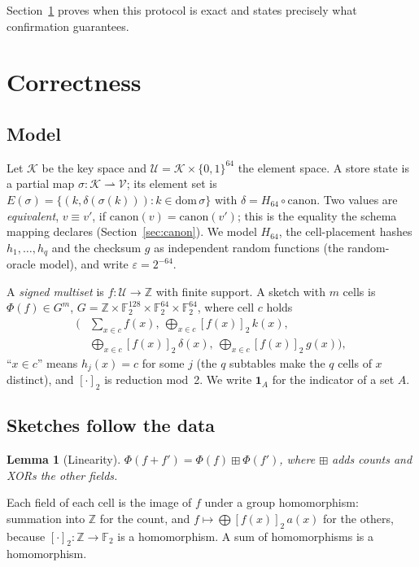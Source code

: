 \documentclass[conference]{IEEEtran}
\newtheorem{lemma}{Lemma}
\begin{document}
Section~\ref{sec:proofs} proves when this protocol is exact and states precisely what confirmation guarantees.

\section{Correctness}\label{sec:proofs}
\subsection{Model}
Let $\mathcal K$ be the key space and $\mathcal U=\mathcal K\times\{0,1\}^{64}$ the element space. A store state is a partial map $\sigma:\mathcal K\rightharpoonup\mathcal V$; its element set is $E(\sigma)=\{(k,\delta(\sigma(k))) : k\in\mathrm{dom}\,\sigma\}$ with $\delta=H_{64}\circ\mathrm{canon}$. Two values are \emph{equivalent}, $v\equiv v'$, if $\mathrm{canon}(v)=\mathrm{canon}(v')$; this is the equality the schema mapping declares (Section~\ref{sec:canon}). We model $H_{64}$, the cell-placement hashes $h_1,\dots,h_q$ and the checksum $g$ as independent random functions (the random-oracle model), and write $\varepsilon=2^{-64}$.

A \emph{signed multiset} is $f:\mathcal U\to\mathbb Z$ with finite support. A sketch with $m$ cells is $\Phi(f)\in G^m$, $G=\mathbb Z\times\mathbb F_2^{128}\times\mathbb F_2^{64}\times\mathbb F_2^{64}$, where cell $c$ holds
\begin{align*}
\Big(&\textstyle\sum_{x\in c} f(x),\ \bigoplus_{x\in c} [f(x)]_2\, k(x),\\
&\textstyle\bigoplus_{x\in c}[f(x)]_2\,\delta(x),\ \bigoplus_{x\in c}[f(x)]_2\, g(x)\Big),
\end{align*}
``$x\in c$'' means $h_j(x)=c$ for some $j$ (the $q$ subtables make the $q$ cells of $x$ distinct), and $[\cdot]_2$ is reduction mod~2. We write $\mathbf 1_A$ for the indicator of a set $A$.

\subsection{Sketches follow the data}
\begin{lemma}[Linearity]\label{lem:lin}
$\Phi(f+f')=\Phi(f)\boxplus\Phi(f')$, where $\boxplus$ adds counts and XORs the other fields.
\end{lemma}
\begin{IEEEproof}
Each field of each cell is the image of $f$ under a group homomorphism: summation into $\mathbb Z$ for the count, and $f\mapsto\bigoplus [f(x)]_2\,a(x)$ for the others, because $[\cdot]_2:\mathbb Z\to\mathbb F_2$ is a homomorphism. A sum of homomorphisms is a homomorphism.
\end{IEEEproof}
\end{document}
